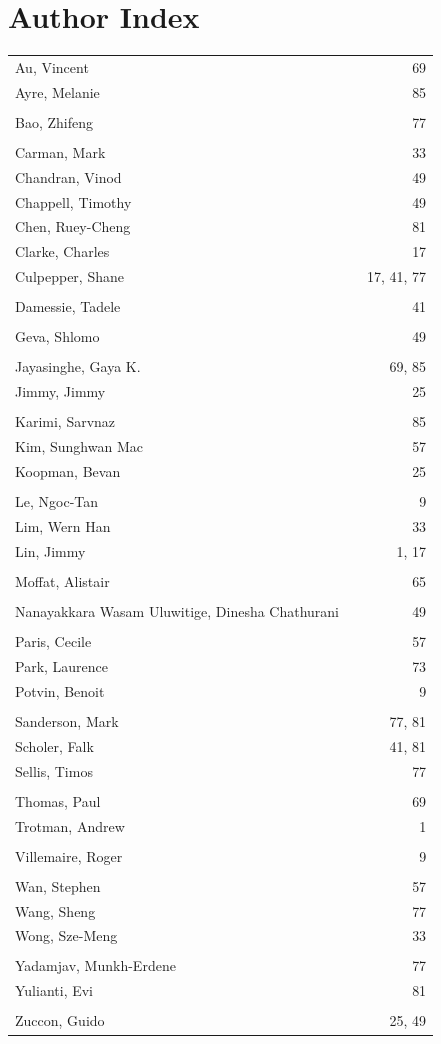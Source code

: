 \documentclass[a4paper]{article}
\begin{document}
\newpage

\section*{Author Index}
\begin{longtable}{lp{10em}r}
Au, Vincent & & 69 
\\
Ayre, Melanie & & 85 
\\
\\
Bao, Zhifeng & & 77 
\\
\\
Carman, Mark & & 33 
\\
Chandran, Vinod & & 49 
\\
Chappell, Timothy & & 49 
\\
Chen, Ruey-Cheng & & 81 
\\
Clarke, Charles & & 17 
\\
Culpepper, Shane & & 17, 41, 77 
\\
\\
Damessie, Tadele & & 41 
\\
\\
Geva, Shlomo & & 49 
\\
\\
Jayasinghe, Gaya K. & & 69, 85 
\\
Jimmy, Jimmy & & 25 
\\
\\
Karimi, Sarvnaz & & 85 
\\
Kim, Sunghwan Mac & & 57 
\\
Koopman, Bevan & & 25 
\\
\\
Le, Ngoc-Tan & & 9 
\\
Lim, Wern Han & & 33 
\\
Lin, Jimmy & & 1, 17 
\\
\\
Moffat, Alistair & & 65 
\\
\\
Nanayakkara Wasam Uluwitige, Dinesha Chathurani & & 49 
\\
\\
Paris, Cecile & & 57 
\\
Park, Laurence & & 73 
\\
Potvin, Benoit & & 9 
\\
\\
Sanderson, Mark & & 77, 81 
\\
Scholer, Falk & & 41, 81 
\\
Sellis, Timos & & 77 
\\
\\
Thomas, Paul & & 69 
\\
Trotman, Andrew & & 1 
\\
\\
Villemaire, Roger & & 9 
\\
\\
Wan, Stephen & & 57 
\\
Wang, Sheng & & 77 
\\
Wong, Sze-Meng & & 33 
\\
\\
Yadamjav, Munkh-Erdene & & 77 
\\
Yulianti, Evi & & 81 
\\
\\
Zuccon, Guido & & 25, 49 
\end{longtable}
\end{document}
